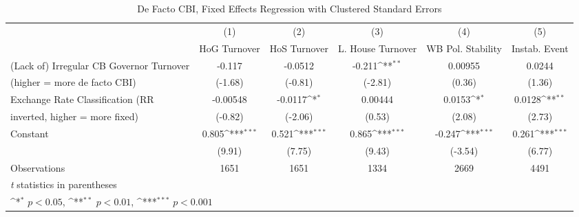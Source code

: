 \begin{table}[htbp]\centering
\def\sym#1{\ifmmode^{#1}\else\(^{#1}\)\fi}
\caption{De Facto CBI, Fixed Effects Regression with Clustered Standard Errors \label{multIndFEDF}}
\begin{tabular}{l*{5}{c}}
\toprule
                                        &\multicolumn{1}{c}{(1)}&\multicolumn{1}{c}{(2)}&\multicolumn{1}{c}{(3)}&\multicolumn{1}{c}{(4)}&\multicolumn{1}{c}{(5)}\\
                                        &\multicolumn{1}{c}{HoG Turnover}&\multicolumn{1}{c}{HoS Turnover}&\multicolumn{1}{c}{L. House Turnover}&\multicolumn{1}{c}{WB Pol. Stability}&\multicolumn{1}{c}{Instab. Event}\\
\midrule
(Lack of) Irregular CB Governor Turnover&   -0.117         &  -0.0512         &   -0.211\sym{**} &  0.00955         &   0.0244         \\
(higher = more de facto CBI)            &  (-1.68)         &  (-0.81)         &  (-2.81)         &   (0.36)         &   (1.36)         \\
\addlinespace
Exchange Rate Classification (RR        & -0.00548         &  -0.0117\sym{*}  &  0.00444         &   0.0153\sym{*}  &   0.0128\sym{**} \\
inverted, higher = more fixed)          &  (-0.82)         &  (-2.06)         &   (0.53)         &   (2.08)         &   (2.73)         \\
\addlinespace
Constant                                &    0.805\sym{***}&    0.521\sym{***}&    0.865\sym{***}&   -0.247\sym{***}&    0.261\sym{***}\\
                                        &   (9.91)         &   (7.75)         &   (9.43)         &  (-3.54)         &   (6.77)         \\
\midrule
Observations                            &     1651         &     1651         &     1334         &     2669         &     4491         \\
\bottomrule
\multicolumn{6}{l}{\footnotesize \textit{t} statistics in parentheses}\\
\multicolumn{6}{l}{\footnotesize \sym{*} \(p<0.05\), \sym{**} \(p<0.01\), \sym{***} \(p<0.001\)}\\
\end{tabular}
\end{table}
